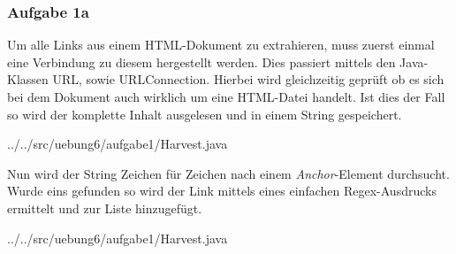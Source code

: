 \subsubsection*{Aufgabe 1a}
Um alle Links aus einem HTML-Dokument zu extrahieren, muss zuerst einmal eine Verbindung zu diesem hergestellt werden.
Dies passiert mittels den Java-Klassen URL, sowie URLConnection. 
Hierbei wird gleichzeitig geprüft ob es sich bei dem Dokument auch wirklich um eine HTML-Datei handelt.
Ist dies der Fall so wird der komplette Inhalt ausgelesen und in einem String gespeichert.

{../../src/uebung6/aufgabe1/Harvest.java}

Nun wird der String Zeichen für Zeichen nach einem \textit{Anchor}-Element durchsucht.
Wurde eins gefunden so wird der Link mittels eines einfachen Regex-Ausdrucks ermittelt und zur Liste hinzugefügt.

{../../src/uebung6/aufgabe1/Harvest.java}
